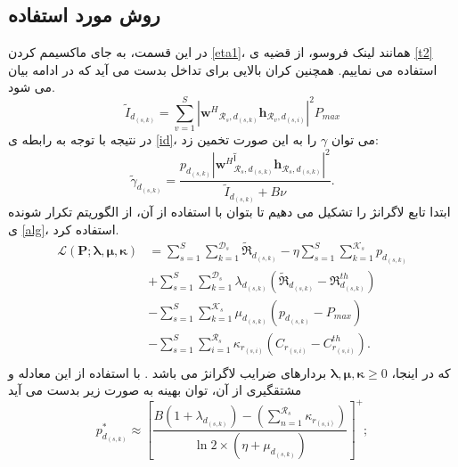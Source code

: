 \subsection{روش مورد استفاده}
در این قسمت، به جای ماکسیمم کردن \eqref{eta1}، همانند لینک فروسو، از قضیه ی \eqref{t2} استفاده می نماییم.
 همچنین کران بالایی برای تداخل بدست می آید که در ادامه بیان می شود.
\begin{equation} \label{id}
\tilde{I}_{d_{(s,k)}} = \sum_{v=1}^{S}  |{\boldsymbol{w}^H}_{\mathcal{R}_s, d_{(s,k)}} \boldsymbol{h}_{\mathcal{R}_v, d_{(s,i)}}|^2 P_{max} 
\end{equation}
در نتیجه با توجه به رابطه ی  \eqref{id}، می توان $\gamma$ را به این صورت تخمین زد:
\begin{equation}
\tilde{\gamma}_{d_{(s,k)}}= \frac{p_{d_{(s,k)}} |{\boldsymbol{w}^H}_{\mathcal{R}_{s},d_{(s,k)}}^آ\boldsymbol{h}_{\mathcal{R}_s, d_{(s,k)}}|^2}{\tilde{I}_{d_{(s,k)}}+B\nu}.
\end{equation}
ابتدا تابع لاگرانژ را تشکیل می دهیم تا بتوان با استفاده از آن، از الگوریتم تکرار شونده ی \eqref{alg}، استفاده کرد. 
\begin{equation}
\begin{split}
\mathcal{L}(\boldsymbol{P}; \boldsymbol{\lambda}, \boldsymbol{\mu}, \boldsymbol{ \kappa}) & = \sum\limits_{s=1}^{S} \sum\limits_{k=1}^{\mathcal{D}_s}\mathfrak{\tilde{R}}_{d_{(s,k)}} 
- \eta \sum\limits_{s=1}^{S} \sum\limits_{k=1}^{\mathcal{K}_s}{p}_{d_{(s,k)}}\\
&+\sum\limits_{s=1}^{S} \sum\limits_{k=1}^{\mathcal{D}_s} \lambda_{d_{(s,k)}} (\mathfrak{\tilde{R}}_{d_{(s,k)}}-\mathfrak{R}_{d_{(s,k)}}^{th})\\
&- \sum\limits_{s=1}^{S} \sum\limits_{k=1}^{\mathcal{K}_s} \mu_{d_{(s,k)}} ({p}_{d_{(s,k)}}-P_{max})\\
&- \sum\limits_{s=1}^{S} \sum\limits_{i=1}^{\mathcal{R}_s} \kappa_{r_{(s,i)}} (C_{r_{(s,i)}}-C_{r_{(s,i)}}^{th}).\\
\end{split}
\end{equation}
که در اینجا، $\boldsymbol{\lambda}, \boldsymbol{\mu}, \boldsymbol{\kappa} \geq 0$
بردارهای ضرایب لاگرانژ می باشد .\newline
با استفاده از این معادله و مشتقگیری از آن، توان بهینه به صورت زیر بدست می آید
\begin{equation}
p_{d_{(s,k)}}^* \approx [\frac{ B(1+\lambda_{d_{(s,k)}} )-(\sum_{n=1}^{\mathcal{R}_s}\kappa_{r_{(s,i)}})}{\ln2 \times (\eta + \mu_{d_{(s,k)}})}]^+;
\end{equation} 

